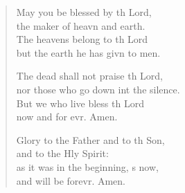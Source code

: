 \begin{verse}
\begin{patverse}
May you be blessed by th Lord,\Med\\
the maker of heavn and earth.\\
The heavens belong to th Lord\Med\\
but the earth he has givn to men.

The dead shall not praise th Lord,\Med\\
nor those who go down int the silence.\\
But we who live bless th Lord\Med\\
now and for evr. Amen.

Glory to the Father and to th Son,\Med\\
and to the Hly Spirit:\\
as it was in the beginning, \pointup{\i}s now,\Med\\
and will be forevr. Amen. 
  \end{patverse}
\end{verse}
